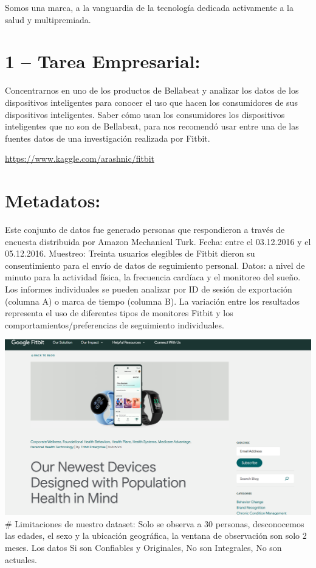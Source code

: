 \documentclass[
]{article}
\begin{document}
Somos una marca, a la vanguardia de la tecnología dedicada activamente a
la salud y multipremiada.

\section{1 -- Tarea Empresarial:}\label{tarea-empresarial}

Concentrarnos en uno de los productos de Bellabeat y analizar los datos
de los dispositivos inteligentes para conocer el uso que hacen los
consumidores de sus dispositivos inteligentes. Saber cómo usan los
consumidores los dispositivos inteligentes que no son de Bellabeat, para
nos recomendó usar entre una de las fuentes datos de una investigación
realizada por Fitbit.

\url{https://www.kaggle.com/arashnic/fitbit}

\section{Metadatos:}\label{metadatos}

Este conjunto de datos fue generado personas que respondieron a través
de encuesta distribuida por Amazon Mechanical Turk. Fecha: entre el
03.12.2016 y el 05.12.2016. Muestreo: Treinta usuarios elegibles de
Fitbit dieron su consentimiento para el envío de datos de seguimiento
personal. Datos: a nivel de minuto para la actividad física, la
frecuencia cardíaca y el monitoreo del sueño. Los informes individuales
se pueden analizar por ID de sesión de exportación (columna A) o marca
de tiempo (columna B). La variación entre los resultados representa el
uso de diferentes tipos de monitores Fitbit y los
comportamientos/preferencias de seguimiento individuales.

\includegraphics{images/Fitbit.png} \# Limitaciones de nuestro dataset:
Solo se observa a 30 personas, desconocemos las edades, el sexo y la
ubicación geográfica, la ventana de observación son solo 2 meses. Los
datos Si son Confiables y Originales, No son Integrales, No son
actuales.
\end{document}
